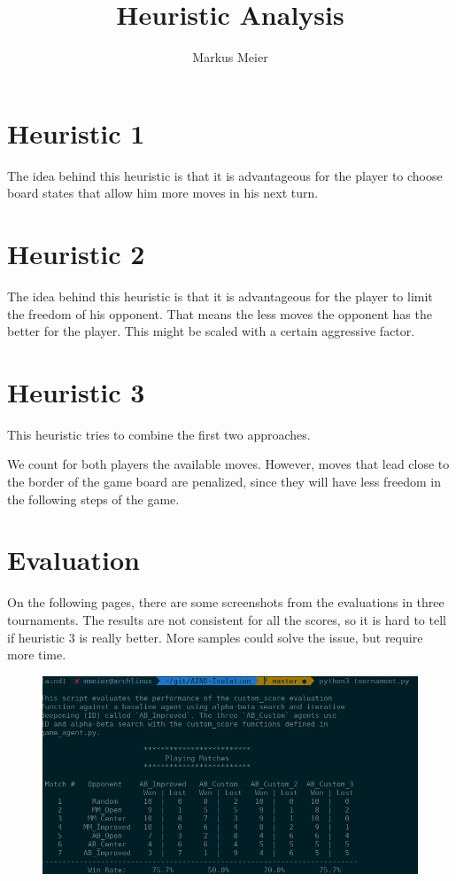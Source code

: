 \documentclass[10pt,a4paper]{article}
\author{Markus Meier}
\title{Heuristic Analysis}
\begin{document}
\maketitle

\section{Heuristic 1}
The idea behind this heuristic is that it is advantageous for the player to choose board states that allow him more moves in his next turn.

\section{Heuristic 2}
The idea behind this heuristic is that it is advantageous for the player to limit the freedom of his opponent. That means the less moves the opponent has the better for the player. This might be scaled with a certain aggressive factor.

\section{Heuristic 3}
This heuristic tries to combine the first two approaches.

We count for both players the available moves.
However, moves that lead close to the border of the game board are penalized,
since they will have less freedom in the following steps of the game.

\section{Evaluation}
On the following pages, there are some screenshots from the evaluations in three tournaments. The results are not consistent for all the scores, so it is hard to tell if heuristic 3 is really better. More samples could solve the issue, but require more time.


\begin{figure}
\includegraphics[scale=0.5]{image1.jpg}
\end{figure}
\end{document}
